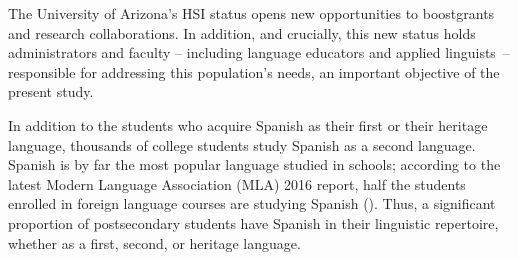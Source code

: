 \documentclass[output=paper]{../langscibook}
\begin{document}
The University of Arizona’s HSI status opens new opportunities to boost\linebreak grants and research collaborations. In addition, and crucially, this new status holds administrators and faculty -- including language educators and applied linguists~-- responsible for addressing this population’s needs, an important objective of the present study.

In addition to the students who acquire Spanish as their first or their heritage language, thousands of college students study Spanish as a second language. Spanish is by far the most popular language studied in schools; according to the latest Modern Language Association (MLA) 2016 report, half the students enrolled in foreign language courses are studying Spanish (). Thus, a significant proportion of postsecondary students have Spanish in their linguistic repertoire, whether as a first, second, or heritage language.
\end{document}
